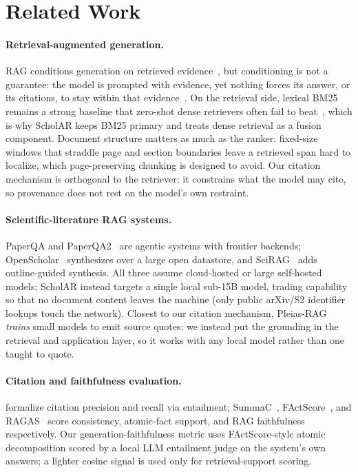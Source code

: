 \documentclass[11pt,letterpaper]{article}
\begin{document}
\section{Related Work}
\label{sec:related}

\paragraph{Retrieval-augmented generation.}
RAG conditions generation on retrieved evidence~\citep{lewis2020rag}, but conditioning is not a
guarantee: the model is prompted with evidence, yet nothing forces its answer, or its citations, to
stay within that evidence~\citep{gao2023attributing}. On the retrieval side, lexical
BM25~\citep{robertson2009bm25} remains a strong baseline that zero-shot dense retrievers often fail
to beat~\citep{thakur2021beir}, which is why ScholAR keeps BM25 primary and treats dense retrieval
as a fusion component. Document structure matters as much as the ranker: fixed-size windows that
straddle page and section boundaries leave a retrieved span hard to localize, which page-preserving
chunking is designed to avoid. Our citation mechanism is orthogonal to the retriever: it constrains
what the model may cite, so provenance does not rest on the model's own restraint.

\paragraph{Scientific-literature RAG systems.}
PaperQA and PaperQA2~\citep{lala2023paperqa,lala2024paperqa2} are agentic systems with frontier
backends; OpenScholar~\citep{asai2024openscholar} synthesizes over a large open datastore, and
SciRAG~\citep{ding2025scirag} adds outline-guided synthesis. All three assume cloud-hosted or large
self-hosted models; ScholAR instead targets a single local sub-15B model, trading capability so
that no document content leaves the machine (only public arXiv/S2 identifier lookups touch the
network). Closest to our citation mechanism, Pleias-RAG~\citep{pleias2025rag}
\emph{trains} small models to emit source quotes; we instead put the grounding in the retrieval and
application layer, so it works with any local model rather than one taught to quote.

\paragraph{Citation and faithfulness evaluation.}
\citet{gao2023attributing} formalize citation precision and recall via entailment;
SummaC~\citep{laban2022summac}, FActScore~\citep{min2023factscore}, and RAGAS~\citep{es2024ragas}
score consistency, atomic-fact support, and RAG faithfulness respectively. Our
generation-faithfulness metric uses FActScore-style atomic decomposition scored by a local LLM
entailment judge on the system's own answers; a lighter cosine signal is used only for
retrieval-support scoring.
\end{document}
